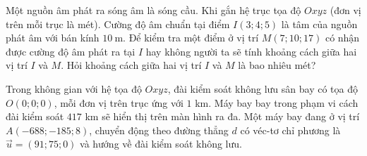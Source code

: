 \begin{ex}%
	Một nguồn âm phát ra sóng âm là sóng cầu. Khi gắn hệ trục tọa độ $O x y z$ (đơn vị trên mỗi trục là mét). Cường độ âm chuẩn tại điểm $I(3 ; 4 ; 5)$ là tâm của nguồn phát âm với bán kính $10 \mathrm{~m}$. Để kiểm tra một điểm ở vị trí $M(7 ; 10 ; 17)$ có nhận được cường độ âm phát ra tại $I$ hay không người ta sẽ tính khoảng cách giữa hai vị trí $I$ và $M$. Hỏi khoảng cách giữa hai vị trí $I$ và $M$ là bao nhiêu mét?
\end{ex}

\begin{ex}%
	Trong không gian với hệ tọa độ $Oxyz$, đài kiểm soát không lưu sân bay có tọa độ $O(0;0;0)$, mỗi đơn vị trên trục ứng với $1$ km. Máy bay bay trong phạm vi cách đài kiểm soát $417$ km sẽ hiển thị trên màn hình ra đa. Một máy bay đang ở vị trí $A\left(-688;-185;8\right)$, chuyển động theo đường thẳng $d$ có véc-tơ chỉ phương là $\vec{u}=(91;75;0)$ và hướng về đài kiểm soát không lưu.
	\begin{center}
\end{center}
\end{ex}
